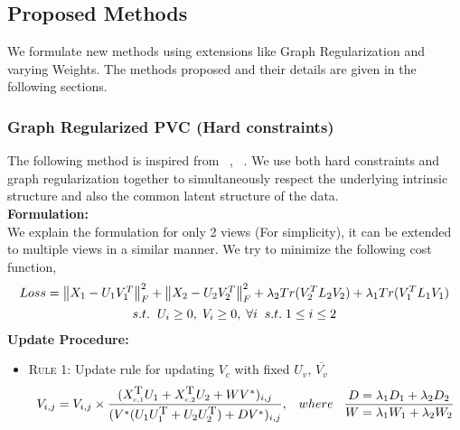 \documentclass[a4paper]{article}
\begin{document}
	\subsection{Proposed Methods}
	
	We formulate new methods using extensions like Graph Regularization and varying Weights. The methods proposed and their details are given in the following sections.	
	
	\subsubsection{Graph Regularized PVC (Hard constraints)}
	
	The following method is inspired from ~\cite{pvc15}, ~\cite{GReg}. We use both hard constraints and graph regularization together to simultaneously respect the underlying intrinsic structure and also the common latent structure of the data.\\	
	
	\noindent
	\textbf{Formulation:}\\
	We explain the formulation for only 2 views (For simplicity), it can be extended to multiple views in a similar manner. We try to minimize the following cost function,
	\begin{multline}
	Loss = \begin{Vmatrix} X_{1}-U_{1}V^{T}_{1} \end{Vmatrix}^{2}_{F}	
		+ \begin{Vmatrix} X_{2}-U_{2}V^{T}_{2} \end{Vmatrix}^{2}_{F}
		+ \lambda_{2}Tr(V^{T}_{2}L_{2}V_{2}) + \lambda_{1}Tr(V^{T}_{1}L_{1}V_{1}) \\	
		s.t. \hspace{2mm}  U_{i}\geq0,\;V_{i}\geq0,\;\forall i \;\;s.t.\; 1 \leq i \leq 2
	\end{multline}
	\noindent
	\textbf{Update Procedure:}
	\begin{itemize}
		\item \textsc{Rule 1:}	Update rule for updating $V_{c}$ with fixed $U_{v}$, $\overline{V_{v}}$
			\begin{multline}
			V_{i,j} = V_{i,j} \times \frac{(X_{\text{\tiny{c,1}}}^{\text{\small{T}}}U_{1}+X_{\text{\tiny{c,2}}}^{\text{\small{T}}}U_{2}+WV^{*})_{i,j}}{(V^{*}(U_{1}U_{1}^{\text{\small{T}}}+U_{2}U_{2}^{\text{\small{T}}})+DV^{*})_{i,j}}, \;\;\; where	\;\;\;
			\frac{D=\lambda_{1}D_{1}+\lambda_{2}D_{2}}{W=\lambda_{1}W_{1}+\lambda_{2}W_{2}}\\		
			\end{multline}
	\end{itemize}		
	
\end{document}
